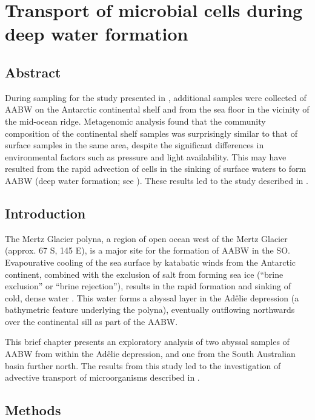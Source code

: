 \chapter[Deep water formation]{Transport of microbial cells during deep water formation}
\label{ch:deepwaterformation}

\section{Abstract}

During sampling for the study presented in , additional samples were collected of \ac{AABW} on the Antarctic continental shelf and from the sea floor in the vicinity of the mid-ocean ridge.
Metagenomic analysis found that the community composition of the continental shelf samples was surprisingly similar to that of surface samples in the same area, despite the significant differences in environmental factors such as pressure and light availability.
This may have resulted from the rapid advection of cells in the sinking of surface waters to form \ac{AABW} (deep water formation; see ).
These results led to the study described in .

\section{Introduction}

The Mertz Glacier polyna, a region of open ocean west of the Mertz Glacier (approx. 67\textdegree{} S, 145\textdegree{} E), is a major site for the formation of \ac{AABW} in the \ac{SO}.
Evapourative cooling of the sea surface by katabatic winds from the Antarctic continent, combined with the exclusion of salt from forming sea ice (``brine exclusion'' or ``brine rejection''), results in the rapid formation and sinking of cold, dense water \cite{Williams:2008iu}.
This water forms a abyssal layer in the Ad\^{e}lie depression (a bathymetric feature underlying the polyna), eventually outflowing northwards over the continental sill as part of the \ac{AABW}.

This brief chapter presents an exploratory analysis of two abyssal samples of \ac{AABW} from within the Ad\^{e}lie depression, and one from the South Australian basin further north.
The results from this study led to the investigation of advective transport of microorganisms described in .

\section{Methods}

